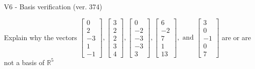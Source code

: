 \begin{exercise}
  \begin{exerciseTitle}V6 - Basis verification (ver. 374)\end{exerciseTitle}
  \begin{exerciseStatement}
    Explain why the vectors \(\left[\begin{array}{r}
0 \\
2 \\
-3 \\
1 \\
-1
\end{array}\right] , \left[\begin{array}{r}
3 \\
2 \\
2 \\
3 \\
4
\end{array}\right] , \left[\begin{array}{r}
0 \\
-2 \\
-3 \\
-3 \\
3
\end{array}\right] , \left[\begin{array}{r}
6 \\
-2 \\
7 \\
1 \\
13
\end{array}\right] , \text{ and } \left[\begin{array}{r}
3 \\
0 \\
-1 \\
0 \\
7
\end{array}\right]\) are or are not a basis of \(\mathbb{R}^5\)	



\end{exerciseStatement}
\end{exercise}
